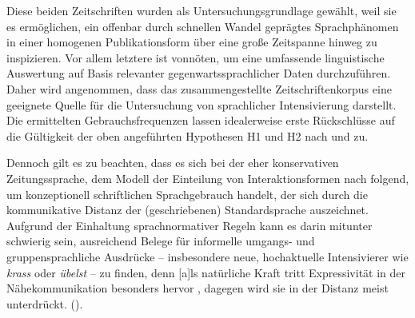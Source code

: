 Diese beiden Zeitschriften wurden als Untersuchungsgrundlage gewählt, weil sie es ermöglichen, ein offenbar durch schnellen Wandel geprägtes Sprachphänomen in einer homogenen Publikationsform \citep[vgl.][61]{Adamzik.2016} über eine große Zeitspanne hinweg zu inspizieren. Vor allem letztere ist vonnöten, um eine umfassende linguistische Auswertung auf Basis relevanter gegenwartssprachlicher Daten durchzuführen. Daher wird angenommen, dass das zusammengestellte Zeitschriftenkorpus eine geeignete Quelle für die Untersuchung von sprachlicher Intensivierung darstellt. Die ermittelten Gebrauchsfrequenzen lassen idealerweise erste Rückschlüsse auf die Gültigkeit der oben angeführten Hypothesen H1 und H2 nach \citet[2]{Hauschild.1899} und \citet[274]{Baumgarten.1908} zu.

Dennoch gilt es zu beachten, dass es sich bei der eher konservativen Zeitungssprache, dem Modell der Einteilung von Interaktionsformen nach \citet[]{Koch.1996,Koch.2007} folgend, um konzeptionell schriftlichen Sprachgebrauch handelt, der sich durch die kommunikative Distanz der (geschriebenen) Standardsprache \citep[vgl.][217,\,226]{Eisenberg.2007} auszeichnet. Aufgrund der Einhaltung sprachnormativer Regeln kann es darin mitunter schwierig sein, ausreichend Belege für informelle umgangs- und gruppensprachliche Ausdrücke -- insbesondere neue, hochaktuelle Intensivierer wie \textit{krass} oder \textit{übelst} -- zu finden, denn \glqq{}[a]ls natürliche Kraft \textelp{} tritt Expressivität in der Nähekommunikation besonders hervor \textelp{}, dagegen wird sie in der Distanz meist unterdrückt.\grqq{} (\citealt[12]{Pustka.2014b}). %
